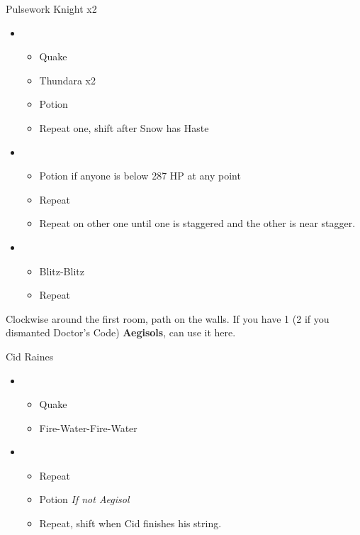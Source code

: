 \begin{multicols}{2}
	\begin{battle}[0:36]{Pulsework Knight x2}
		\begin{itemize}
			\item \first
			      \begin{itemize}
				      \item Quake
				      \item Thundara x2
				      \item Potion
				      \item Repeat one, shift after Snow has Haste
			      \end{itemize}
			\item \second
			      \begin{itemize}
				      \item Potion if anyone is below 287 HP at any point
				      \item Repeat
				      \item Repeat on other one until one is staggered and the other is near stagger.
			      \end{itemize}
			\item \sixth
			      \begin{itemize}
				      \item Blitz-Blitz
				      \item Repeat
			      \end{itemize}
		\end{itemize}
	\end{battle}
	Clockwise around the first room, path on the walls.
	If you have 1 (2 if you dismanted Doctor's Code) \textbf{Aegisols}, can use it here.
	\begin{battle}[1:40]{Cid Raines}
		\begin{itemize}
			\item \first
			      \begin{itemize}
				      \item Quake
				      \item Fire-Water-Fire-Water
			      \end{itemize}
			\item \third
			      \begin{itemize}
				      \item Repeat
				      \item Potion \textit{If not Aegisol}
				      \item Repeat, shift when Cid finishes his string.

\end{itemize}
\end{itemize}
\end{battle}
\end{multicols}
